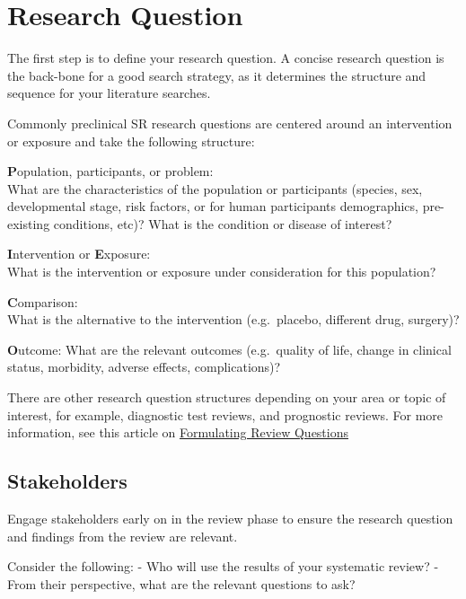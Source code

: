 \documentclass[
]{book}
\begin{document}
\hypertarget{researchquestion}{%
\chapter{Research Question}\label{researchquestion}}

The first step is to define your research question. A concise research question is the back-bone for a good search strategy, as it determines the structure and sequence for your literature searches.

Commonly preclinical SR research questions are centered around an intervention or exposure and take the following structure:

\textbf{P}opulation, participants, or problem:\\
What are the characteristics of the population or participants (species, sex, developmental stage, risk factors, or for human participants demographics, pre-existing conditions, etc)?
What is the condition or disease of interest?

\textbf{I}ntervention or \textbf{E}xposure:\\
What is the intervention or exposure under consideration for this population?

\textbf{C}omparison:\\
What is the alternative to the intervention (e.g.~placebo, different drug, surgery)?

\textbf{O}utcome:
What are the relevant outcomes (e.g.~quality of life, change in clinical status, morbidity, adverse effects, complications)?

There are other research question structures depending on your area or topic of interest, for example, diagnostic test reviews, and prognostic reviews.
For more information, see this article on \href{https://journals.library.ualberta.ca/eblip/index.php/EBLIP/article/view/9741/8144}{Formulating Review Questions}

\hypertarget{stakeholders}{%
\section{Stakeholders}\label{stakeholders}}

Engage stakeholders early on in the review phase to ensure the research question and findings from the review are relevant.

Consider the following:
- Who will use the results of your systematic review?
- From their perspective, what are the relevant questions to ask?
\end{document}
